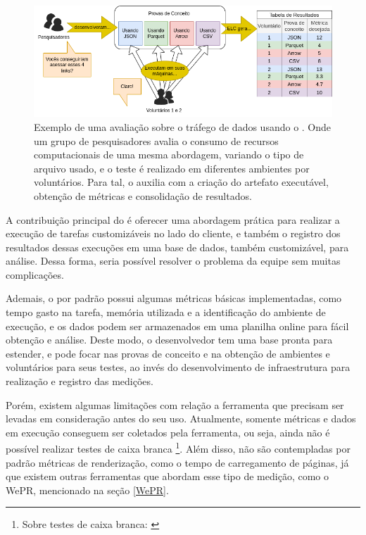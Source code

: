 \documentclass[12pt]{tcc}
\begin{document}
	\begin{figure}[!ht]
		\centering
		\includegraphics[width=\textwidth]{figures/exemplo-tipo-de-dado.png}
		\caption[Exemplo de uma avaliação usando o ELC]{Exemplo de uma avaliação sobre o tráfego de dados usando o . Onde um grupo de pesquisadores avalia o consumo de recursos computacionais de uma mesma abordagem, variando o tipo de arquivo usado, e o teste é realizado em diferentes ambientes por voluntários. Para tal, o  auxilia com a criação do artefato executável, obtenção de métricas e consolidação de resultados.}
		\label{fig:exemplo-tipo-de-dado}
	\end{figure}

	A contribuição principal do  é oferecer uma abordagem prática para realizar a execução de tarefas customizáveis no lado do cliente, e também o registro dos resultados dessas execuções em uma base de dados, também customizável, para análise. Dessa forma, seria possível resolver o problema da equipe sem muitas complicações. 

	Ademais, o  por padrão possui algumas métricas básicas implementadas, como tempo gasto na tarefa, memória utilizada e a identificação do ambiente de execução, e os dados podem ser armazenados em uma planilha online para fácil obtenção e análise. Deste modo, o desenvolvedor tem uma base pronta para estender, e pode focar nas provas de conceito e na obtenção de ambientes e voluntários para seus testes, ao invés do desenvolvimento de infraestrutura para realização e registro das medições.

	Porém, existem algumas limitações com relação a ferramenta que precisam ser levadas em consideração antes do seu uso. Atualmente, somente métricas e dados em execução conseguem ser coletados pela ferramenta, ou seja, ainda não é possível realizar testes de caixa branca \footnote{Sobre testes de caixa branca: \citep[Capítulo 21]{Sommerville2015Software}}. Além disso, não são contempladas por padrão métricas de renderização, como o tempo de carregamento de páginas, já que existem outras ferramentas que abordam esse tipo de medição, como o WePR, mencionado na seção \ref{WePR}.
\end{document}
